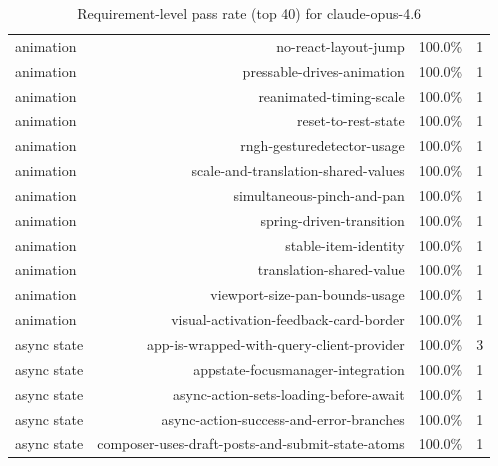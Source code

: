 \begin{table}[htbp]
\begin{tabular}{lrrr}
animation & no-react-layout-jump & 100.0\% & 1 \\
animation & pressable-drives-animation & 100.0\% & 1 \\
animation & reanimated-timing-scale & 100.0\% & 1 \\
animation & reset-to-rest-state & 100.0\% & 1 \\
animation & rngh-gesturedetector-usage & 100.0\% & 1 \\
animation & scale-and-translation-shared-values & 100.0\% & 1 \\
animation & simultaneous-pinch-and-pan & 100.0\% & 1 \\
animation & spring-driven-transition & 100.0\% & 1 \\
animation & stable-item-identity & 100.0\% & 1 \\
animation & translation-shared-value & 100.0\% & 1 \\
animation & viewport-size-pan-bounds-usage & 100.0\% & 1 \\
animation & visual-activation-feedback-card-border & 100.0\% & 1 \\
async state & app-is-wrapped-with-query-client-provider & 100.0\% & 3 \\
async state & appstate-focusmanager-integration & 100.0\% & 1 \\
async state & async-action-sets-loading-before-await & 100.0\% & 1 \\
async state & async-action-success-and-error-branches & 100.0\% & 1 \\
async state & composer-uses-draft-posts-and-submit-state-atoms & 100.0\% & 1 \\
\bottomrule
\end{tabular}
\caption{Requirement-level pass rate (top 40) for claude-opus-4.6}
\end{table}
